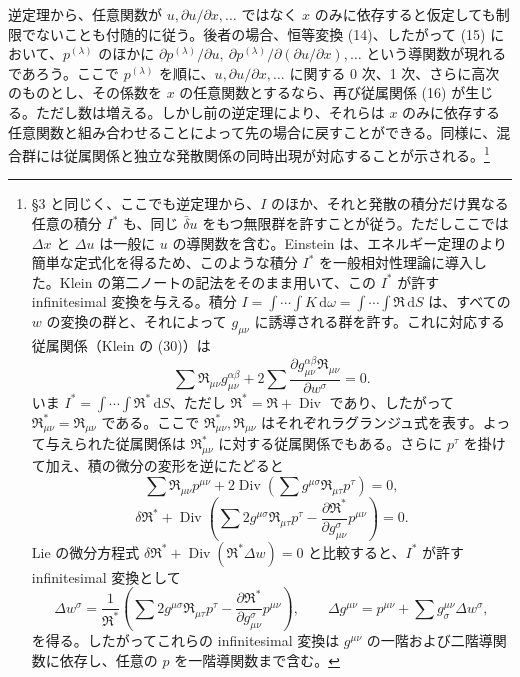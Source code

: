 \documentclass[11pt]{article}
\newcommand{\D}{\Delta}
\providecommand{\dd}{\mathrm d}
\providecommand{\Div}{\operatorname{Div}}
\providecommand{\bd}{\bar{\delta}}
\providecommand{\p}{\partial}
\begin{document}
逆定理から、任意関数が \(u,\p u/\p x,\ldots\) ではなく \(x\) のみに依存すると仮定しても制限でないことも付随的に従う。後者の場合、恒等変換 (14)、したがって (15) において、\(p^{(\lambda)}\) のほかに \(\p p^{(\lambda)}/\p u,\ \p p^{(\lambda)}/\p(\p u/\p x),\ldots\) という導関数が現れるであろう。ここで \(p^{(\lambda)}\) を順に、\(u,\p u/\p x,\ldots\) に関する 0 次、1 次、さらに高次のものとし、その係数を \(x\) の任意関数とするなら、再び従属関係 (16) が生じる。ただし数は増える。しかし前の逆定理により、それらは \(x\) のみに依存する任意関数と組み合わせることによって先の場合に戻すことができる。同様に、混合群には従属関係と独立な発散関係の同時出現が対応することが示される。\footnote{\S{}3 と同じく、ここでも逆定理から、\(I\) のほか、それと発散の積分だけ異なる任意の積分 \(I^*\) も、同じ \(\bd u\) をもつ無限群を許すことが従う。ただしここでは \(\D x\) と \(\D u\) は一般に \(u\) の導関数を含む。Einstein は、エネルギー定理のより簡単な定式化を得るため、このような積分 \(I^*\) を一般相対性理論に導入した。Klein の第二ノートの記法をそのまま用いて、この \(I^*\) が許す infinitesimal 変換を与える。積分 \(I=\int\!\cdots\!\int K\,\dd\omega=\int\!\cdots\!\int \mathfrak{R}\,\dd S\) は、すべての \(w\) の変換の群と、それによって \(g_{\mu\nu}\) に誘導される群を許す。これに対応する従属関係（Klein の (30)）は
\[
\sum \mathfrak{R}_{\mu\nu}g_{\mu\nu}^{\alpha\beta}
+2\sum\frac{\p g_{\mu\nu}^{\alpha\beta}\mathfrak{R}_{\mu\nu}}{\p w^\sigma}=0.
\]
いま \(I^*=\int\!\cdots\!\int \mathfrak{R}^*\,\dd S\)、ただし \(\mathfrak{R}^*=\mathfrak{R}+\Div\) であり、したがって \(\mathfrak{R}_{\mu\nu}^*=\mathfrak{R}_{\mu\nu}\) である。ここで \(\mathfrak{R}_{\mu\nu}^*,\mathfrak{R}_{\mu\nu}\) はそれぞれラグランジュ式を表す。よって与えられた従属関係は \(\mathfrak{R}_{\mu\nu}^*\) に対する従属関係でもある。さらに \(p^\tau\) を掛けて加え、積の微分の変形を逆にたどると
\[
\sum \mathfrak{R}_{\mu\nu}p^{\mu\nu}
+2\Div\!\left(\sum g^{\mu\sigma}\mathfrak{R}_{\mu\tau}p^\tau\right)=0,
\]
\[
\delta\mathfrak{R}^*+\Div\!\left(\sum 2g^{\mu\sigma}\mathfrak{R}_{\mu\tau}p^\tau
-\frac{\p\mathfrak{R}^*}{\p g_{\mu\nu}^{\sigma}}p^{\mu\nu}\right)=0.
\]
Lie の微分方程式
\(\delta\mathfrak{R}^*+\Div(\mathfrak{R}^*\D w)=0\) と比較すると、\(I^*\) が許す infinitesimal 変換として
\[
\D w^\sigma=\frac1{\mathfrak{R}^*}\left(\sum 2g^{\mu\sigma}\mathfrak{R}_{\mu\tau}p^\tau
-\frac{\p\mathfrak{R}^*}{\p g_{\mu\nu}^{\sigma}}p^{\mu\nu}\right),
\qquad
\D g^{\mu\nu}=p^{\mu\nu}+\sum g^{\mu\nu}_{\sigma}\D w^\sigma,
\]
を得る。したがってこれらの infinitesimal 変換は \(g^{\mu\nu}\) の一階および二階導関数に依存し、任意の \(p\) を一階導関数まで含む。}
\end{document}
